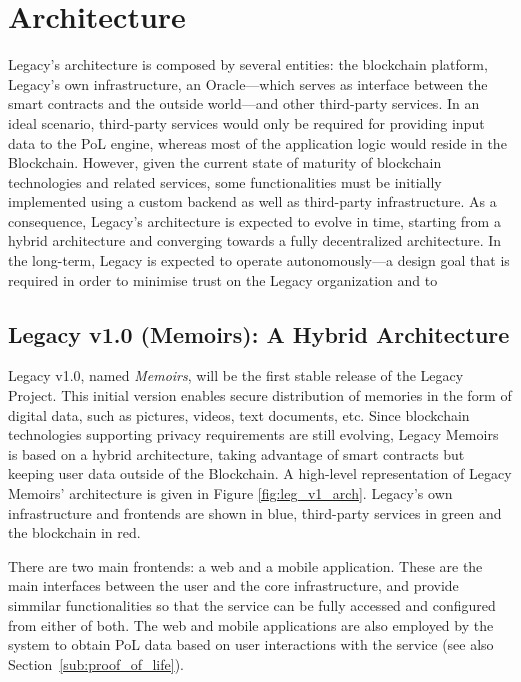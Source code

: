 \chapter{Architecture} %
\label{cha:architecture}

Legacy’s architecture is composed by several entities: the blockchain platform, Legacy’s own infrastructure, an Oracle---which serves as interface between the smart contracts and the outside world---and other third-party services. In an ideal scenario, third-party services would only be required for providing input data to the PoL engine, whereas most of the application logic would reside in the Blockchain. However, given the current state of maturity of blockchain technologies and related services, some functionalities must be initially implemented using a custom backend as well as third-party infrastructure. As a consequence, Legacy’s architecture is expected to evolve in time, starting from a hybrid architecture and converging towards a fully decentralized architecture.
In the long-term, Legacy is expected to operate autonomously---a design goal that is required in order to minimise trust on the Legacy organization and to


\section{Legacy v1.0 (Memoirs): A Hybrid Architecture} %
\label{sec:legacy_v1_0_memoirs_a_hybrid_architecture}
Legacy v1.0, named \textit{Memoirs}, will be the first stable release of the Legacy Project. This initial version enables secure distribution of memories in the form of digital data, such as pictures, videos, text documents, etc. Since blockchain technologies supporting privacy requirements are still evolving, Legacy Memoirs is based on a hybrid architecture, taking advantage of smart contracts but keeping user data outside of the Blockchain.
A high-level representation of Legacy Memoirs’ architecture is given in Figure \ref{fig:leg_v1_arch}. Legacy’s own infrastructure and frontends are shown in blue, third-party services in green and the blockchain in red. 

There are two main frontends: a web and a mobile application. These are the main interfaces between the user and the core infrastructure, and provide simmilar functionalities so that the service can be fully accessed and configured from either of both.
The web and mobile applications are also employed by the system to obtain PoL data based on user interactions with the service (see also Section~\ref{sub:proof_of_life}).

